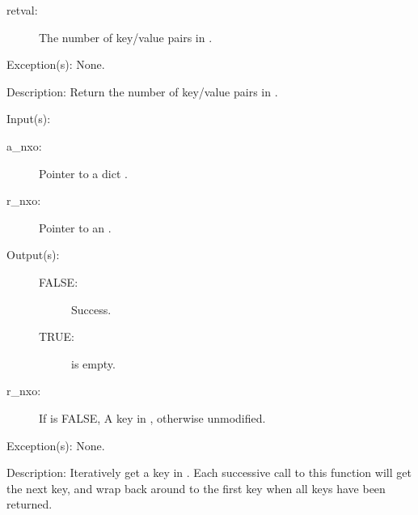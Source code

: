 \begin{capi}
\begin{capilist}
\begin{description}
		\item[retval: ]
			The number of key/value pairs in .
		\end{description}
	\item[Exception(s): ] None.
	\item[Description: ]
		Return the number of key/value pairs in .
	\end{capilist}
\label{nxo_dict_iterate}
	\begin{capilist}
	\item[Input(s): ]
		\begin{description}\item[]
		\item[a\_nxo: ]
			Pointer to a dict .
		\item[r\_nxo: ]
			Pointer to an .
		\end{description}
	\item[Output(s): ]
		\begin{description}\item[]
			\begin{description}\item[]
			\item[FALSE: ]
				Success.
			\item[TRUE: ]
				 is empty.
			\end{description}
		\item[r\_nxo: ]
			If  is FALSE, A key in ,
			otherwise unmodified.
		\end{description}
	\item[Exception(s): ] None.
	\item[Description: ]
		Iteratively get a key in .  Each successive call to
		this function will get the next key, and wrap back around to the
		first key when all keys have been returned.
	\end{capilist}
\end{capi}
